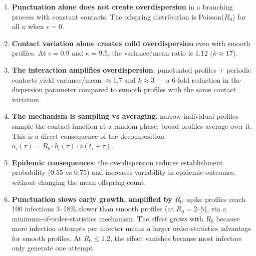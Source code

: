 \documentclass[11pt]{article}
\begin{document}
\begin{enumerate}
\item \textbf{Punctuation alone does not create overdispersion} in a branching process with constant contacts. The offspring distribution is Poisson($R_0$) for all $\kappa$ when $\epsilon = 0$.

\item \textbf{Contact variation alone creates mild overdispersion} even with smooth profiles. At $\epsilon = 0.9$ and $\kappa = 9.5$, the variance/mean ratio is 1.12 ($k \approx 17$).

\item \textbf{The interaction amplifies overdispersion}: punctuated profiles + periodic contacts yield variance/mean $\approx 1.7$ and $k \approx 3$ --- a 6-fold reduction in the dispersion parameter compared to smooth profiles with the same contact variation.

\item \textbf{The mechanism is sampling vs averaging}: narrow individual profiles sample the contact function at a random phase; broad profiles average over it. This is a direct consequence of the decomposition $a_i(\tau) = R_0 \cdot b_i(\tau) \cdot z(t_i + \tau)$.

\item \textbf{Epidemic consequences}: the overdispersion reduces establishment probability (0.55 vs 0.75) and increases variability in epidemic outcomes, without changing the mean offspring count.

\item \textbf{Punctuation slows early growth, amplified by $R_0$}: spike profiles reach 100 infections 3--18\% slower than smooth profiles (at $R_0 = 2$--$5$), via a minimum-of-order-statistics mechanism. The effect grows with $R_0$ because more infection attempts per infector means a larger order-statistics advantage for smooth profiles. At $R_0 \leq 1.2$, the effect vanishes because most infectors only generate one attempt.
\end{enumerate}
\end{document}
